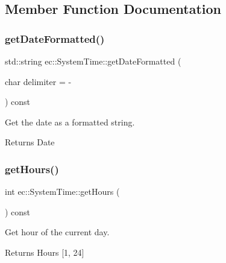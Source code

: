 \subsection{Member Function Documentation}
\mbox{\label{classec_1_1_system_time_a98c7e6d5cce91b572416c8780d7b9ca6}} 
\subsubsection{\texorpdfstring{get\+Date\+Formatted()}{getDateFormatted()}}
{\footnotesize\ttfamily std\+::string ec\+::\+System\+Time\+::get\+Date\+Formatted (\begin{DoxyParamCaption}\item[{char}]{delimiter = {\ttfamily \textquotesingle{}-\/\textquotesingle{}} }\end{DoxyParamCaption}) const}



Get the date as a formatted string. 

\begin{DoxyReturn}{Returns}
Date 
\end{DoxyReturn}
\mbox{\label{classec_1_1_system_time_a3faf36ab354c3dd42f8039123c5d2271}} 
\subsubsection{\texorpdfstring{get\+Hours()}{getHours()}}
{\footnotesize\ttfamily int ec\+::\+System\+Time\+::get\+Hours (\begin{DoxyParamCaption}{ }\end{DoxyParamCaption}) const}



Get hour of the current day. 

\begin{DoxyReturn}{Returns}
Hours \mbox{[}1, 24\mbox{]} 
\end{DoxyReturn}
\mbox{\label{classec_1_1_system_time_a4eb52bc27f4a71111ac04cbc1fe882e0}} 
